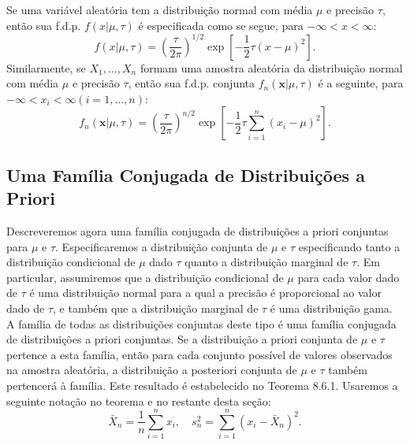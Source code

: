 Se uma variável aleatória tem a distribuição normal com média $\mu$ e precisão $\tau$, então sua f.d.p. $f(x|\mu, \tau)$ é especificada como se segue, para $-\infty < x < \infty$:
\[
f(x|\mu, \tau) = \left(\frac{\tau}{2\pi}\right)^{1/2} \exp\left[-\frac{1}{2}\tau(x-\mu)^2\right].
\]
Similarmente, se $X_1, \dots, X_n$ formam uma amostra aleatória da distribuição normal com média $\mu$ e precisão $\tau$, então sua f.d.p. conjunta $f_n(\mathbf{x}|\mu, \tau)$ é a seguinte, para $-\infty < x_i < \infty (i=1, \dots, n)$:
\[
f_n(\mathbf{x}|\mu, \tau) = \left(\frac{\tau}{2\pi}\right)^{n/2} \exp\left[-\frac{1}{2}\tau\sum_{i=1}^{n}(x_i - \mu)^2\right].
\]

\subsection*{Uma Família Conjugada de Distribuições a Priori}

Descreveremos agora uma família conjugada de distribuições a priori conjuntas para $\mu$ e $\tau$. Especificaremos a distribuição conjunta de $\mu$ e $\tau$ especificando tanto a distribuição condicional de $\mu$ dado $\tau$ quanto a distribuição marginal de $\tau$. Em particular, assumiremos que a distribuição condicional de $\mu$ para cada valor dado de $\tau$ é uma distribuição normal para a qual a precisão é proporcional ao valor dado de $\tau$, e também que a distribuição marginal de $\tau$ é uma distribuição gama. A família de todas as distribuições conjuntas deste tipo é uma família conjugada de distribuições a priori conjuntas. Se a distribuição a priori conjunta de $\mu$ e $\tau$ pertence a esta família, então para cada conjunto possível de valores observados na amostra aleatória, a distribuição a posteriori conjunta de $\mu$ e $\tau$ também pertencerá à família. Este resultado é estabelecido no Teorema 8.6.1. Usaremos a seguinte notação no teorema e no restante desta seção:
\[
\bar{X}_n = \frac{1}{n}\sum_{i=1}^n x_i, \quad s_n^2 = \sum_{i=1}^n (x_i - \bar{X}_n)^2.
\]

